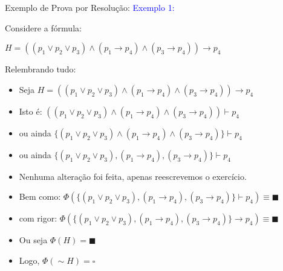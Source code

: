 \begin{frame}{Exemplo de Prova por Resolução:}
 \textcolor{blue}{Exemplo 1:} 

Considere a fórmula: 

$H=((p_1 \vee p_2 \vee p_3) \wedge (p_1 \rightarrow p_4) \wedge (p_3 \rightarrow p_4)) \rightarrow p_4$

Relembrando tudo:

\begin{itemize}
\item Seja $H=((p_1 \vee p_2 \vee p_3) \wedge (p_1 \rightarrow p_4) \wedge (p_3 \rightarrow p_4)) \rightarrow p_4$

\item Isto é: $((p_1 \vee p_2 \vee p_3) \wedge (p_1 \rightarrow p_4) \wedge (p_3 \rightarrow p_4)) \vdash p_4$

\item ou ainda  $\{(p_1 \vee p_2 \vee p_3) \wedge (p_1 \rightarrow p_4) \wedge (p_3 \rightarrow p_4)\} \vdash p_4$

\item ou ainda  $\{(p_1 \vee p_2 \vee p_3) , (p_1 \rightarrow p_4) , (p_3 \rightarrow p_4)\} \vdash p_4$

\item Nenhuma alteração foi feita, apenas reescrevemos o exercício.

\item Bem como:  $\Phi(\{(p_1 \vee p_2 \vee p_3) , (p_1 \rightarrow p_4) , (p_3 \rightarrow p_4)\} \vdash p_4) \equiv \blacksquare$

\item com rigor: $\Phi(\{(p_1 \vee p_2 \vee p_3) , (p_1 \rightarrow p_4) , (p_3 \rightarrow p_4)\} \rightarrow p_4) \equiv \blacksquare$

\item Ou seja  $\Phi(H) = \blacksquare$

\item Logo, $\Phi(\sim H) = \square$

\end{itemize}
\end{frame}

